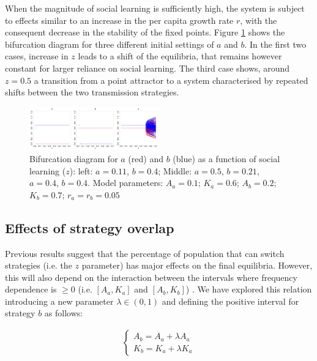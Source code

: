 \documentclass[3p,authoryear,twocolumn]{elsarticle} %
\begin{document}
When the magnitude of social learning is sufficiently high, the system is subject to effects similar to an increase in the per capita growth rate $r$, with the consequent decrease in the stability of the fixed points. Figure \ref{fig:bifurcationWithTransmission} shows the bifurcation diagram for three different initial settings of $a$ and $b$. In the first two cases, increase in $z$ leads to a shift of the equilibria, that remains however constant for larger reliance on social learning. The third case shows, around $z=0.5$ a transition from a point attractor to a system characterised by repeated shifts between the two transmission strategies. 
\begin{figure}[h!]
  \centering
      \includegraphics[width=0.5\textwidth]{./figures/figure4.jpg}
  \caption{Bifurcation diagram for $a$ (red) and $b$ (blue) as a function of social learning ($z$): left: $a=0.11$, $b=0.4$; Middle: $a=0.5$, $b=0.21$, $a=0.4$, $b=0.4$. Model parameters:  $A_a=0.1$; $K_a=0.6$; $A_b=0.2$; $K_b=0.7$; $r_a=r_b=0.05$}
    \label{fig:bifurcationWithTransmission}
\end{figure}



\subsection{Effects of strategy overlap}

Previous results suggest that the percentage of population that can switch strategies (i.e. the $z$ parameter) has major effects on the final equilibria. However, this will also depend on the interaction between the intervals where frequency dependence is $\geq 0$ (i.e. $[A_a,K_a]$ and $[A_b,K_b]$) . We have explored this relation introducing a new parameter $\lambda \in (0,1)$ and defining the positive interval for strategy $b$ as follows:

\begin{align}
\label{eqOverlap}
\begin{cases}
A_b = A_a + \lambda A_a\\
K_b = K_a + \lambda K_a
\end{cases}
\end{align}
\end{document}
